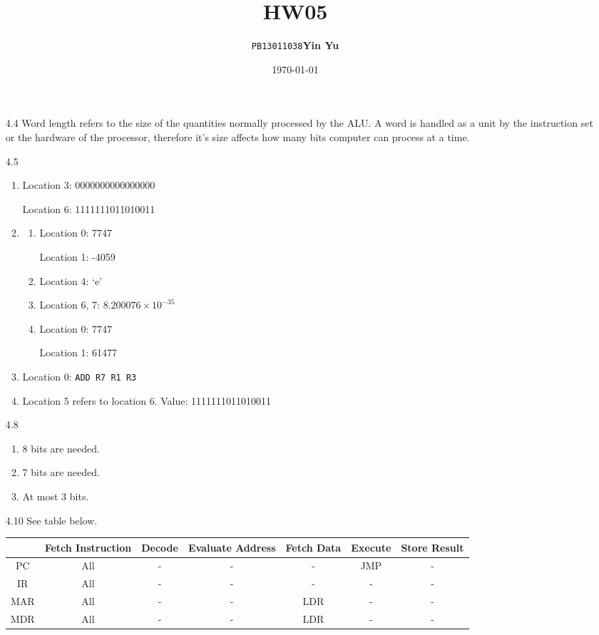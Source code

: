 \documentclass[a4paper]{article}
\title{\textbf{HW05}}
\author{\texttt{PB13011038}\quad\textbf{Yin Yu}}
\date{\today}
\begin{document}
\maketitle

\begin{enumerate}

\item[4.4] Word length refers to the size of the quantities normally
  processed by the ALU. A word is handled as a unit by the instruction
  set or the hardware of the processor, therefore it's size affects
  how many bits computer can process at a time.

\item[4.5] 
\begin{enumerate}
\item Location 3: 0000000000000000

  Location 6: 1111111011010011
\item 
\begin{enumerate}
\item Location 0: 7747

  Location 1: -4059
\item Location 4: `e'
\item Location 6, 7: $8.200076\times10^{-35}$
\item Location 0: 7747

Location 1: 61477
\end{enumerate}

\item Location 0: \verb+ADD R7 R1 R3+

\item Location 5 refers to location 6. Value: 1111111011010011
\end{enumerate}

\item[4.8]
\begin{enumerate}
\item 8 bits are needed.
\item 7 bits are needed.
\item At most 3 bits.
\end{enumerate}

\item[4.10] See table below.
\begin{center}
\begin{tabular}{c|c|c|c|c|c|c}
\hline
& Fetch Instruction & Decode & Evaluate Address & Fetch Data & Execute
& Store Result \\
\hline
PC & All & - & - & - & JMP & - \\
IR & All & - & - & - & - & - \\
MAR & All & - & - & LDR & - & - \\
MDR & All & - & - & LDR & - & - \\
\hline
\end{tabular}
\end{center}


\end{enumerate}
\end{document}
